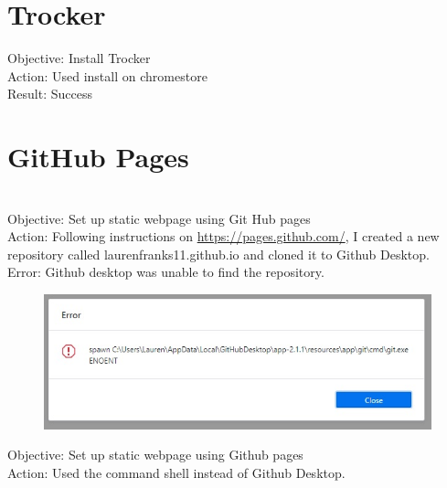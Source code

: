 \documentclass{article}
\begin{document}
\section{Trocker}
Objective: Install Trocker \\
Action: Used install on chromestore\\
Result: Success\\



\section{GitHub Pages}\\
Objective: Set up static webpage using Git Hub pages\\
Action: Following instructions on \href{https://pages.github.com/}{https://pages.github.com/}, I created a new repository called laurenfranks11.github.io and cloned it to Github Desktop.\\
Error: Github desktop was unable to find the repository.
\begin{figure}[htp]
    \centering
    \includegraphics[width=15cm]{github desktop error.jpg}
\end{figure}
\newpage
Objective: Set up static webpage using Github pages\\
Action: Used the command shell instead of Github Desktop.
\newline
\end{document}

